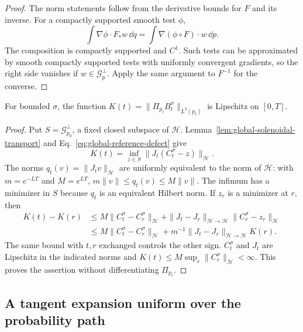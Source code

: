 \begin{proof}
The norm statements follow from the derivative bounds for $F$ and its
inverse.  For a compactly supported smooth test $\phi$,
\[
 \int\nabla\phi\cdot F_*w\,\dd q
 =\int\nabla(\phi\circ F)\cdot w\,\dd p.
\]
The composition is compactly supported and $C^1$.  Such tests can be
approximated by smooth compactly supported tests with uniformly
convergent gradients, so the right side vanishes if
$w\in\mathcal G_p^\perp$.  Apply the same argument to $F^{-1}$ for
the converse.
\end{proof}

\begin{lemma}
\label{lem:global-coefficient-continuity}
For bounded $\sigma$, the function
$K(t)=\|\Pi_{p_t}B_t^\sigma\|_{L^2(p_t)}$ is Lipschitz on $[0,T]$.
\end{lemma}

\begin{proof}
Put $S=\mathcal G_{p_0}^\perp$, a fixed closed subspace of $\mathcal H$.
Lemma~\ref{lem:global-solenoidal-transport} and
Eq.~\eqref{eq:global-reference-defect} give
\begin{equation}
 K(t)=\inf_{z\in S}\|J_t(C_t^\sigma-z)\|_{\mathcal H}.
 \label{eq:global-fixed-hilbert-distance}
\end{equation}
The norms $q_t(v)=\|J_tv\|_{\mathcal H}$ are uniformly equivalent to
the norm of $\mathcal H$: with $m=e^{-LT}$ and $M=e^{LT}$,
$m\|v\|\le q_t(v)\le M\|v\|$.  The infimum has a minimizer in
$S$ because $q_t$ is an equivalent Hilbert norm.  If $z_r$ is a
minimizer at $r$, then
\begin{align*}
 K(t)-K(r)
 &\le M\|C_t^\sigma-C_r^\sigma\|_{\mathcal H}
   +\|J_t-J_r\|_{\mathcal H\to\mathcal H}
       \|C_r^\sigma-z_r\|_{\mathcal H}\\
 &\le M\|C_t^\sigma-C_r^\sigma\|_{\mathcal H}
   +m^{-1}\|J_t-J_r\|_{\mathcal H\to\mathcal H}K(r).
\end{align*}
The same bound with $t,r$ exchanged controls the other sign.
$C_t^\sigma$ and $J_t$ are Lipschitz in the indicated norms and
$K(t)\le M\sup_r\|C_r^\sigma\|_{\mathcal H}<\infty$.  This proves
the assertion without differentiating $\Pi_{p_t}$.
\end{proof}

\subsection{A tangent expansion uniform over the probability path}

